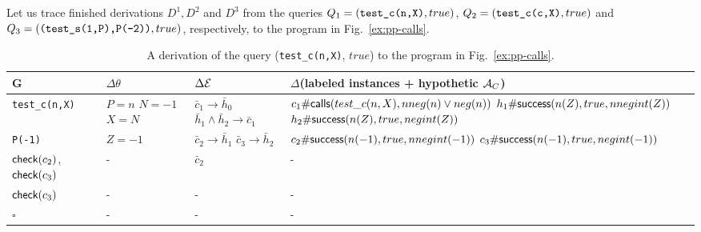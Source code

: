 \documentclass{llncs}
\newcommand{\AC}
  {\ensuremath{{\cal A}_{C}}}
\newcommand{\kbd}[1]{\mbox{\tt #1}}
\newcommand{\emptyGoal}{\ensuremath{\square}}
\newcommand{\ADeps}{\ensuremath{{\cal E}}}
\newcommand{\asrId}[1]{\ensuremath{c_{#1}}}
\newcommand{\negAsrId}[1]{\ensuremath{\bar{c}_{#1}}}
\newcommand{\hypId}[1]{\ensuremath{h_{#1}}}
\newcommand{\negHypId}[1]{\ensuremath{\bar{h}_{#1}}}
\newcommand{\checkLitLab}[1]{\ensuremath{\textsf{check}(#1)}}
\newcommand{\labCallsAsr}[3]
  {\ensuremath{\textsf{\asrId{#1}\#calls}(#2, #3)}}
\newcommand{\labSuccessAsr}[4]
  {\ensuremath{\textsf{\asrId{#1}\#success}(#2, #3, #4)}}
\newcommand{\hypSuccessAsr}[4]
  {\ensuremath{\textsf{\hypId{#1}\#success}(#2, #3, #4)}}
\begin{document}
Let us trace finished derivations $D^1,D^2$ and $D^3$ from the queries
$Q_1 = (\kbd{test\_c(n,X)}, true)$, $Q_2 = (\kbd{test\_c(c,X)}, true)$
and $Q_3 = (\kbd{(test\_s(1,P),P(-2))}, true)$, respectively, to the
program in Fig.~\ref{ex:pp-calls}.

\begin{table}[h]
  \caption{A derivation of the query (\kbd{test\_c(n,X)}, $true$) to
    the program in Fig.~\ref{ex:pp-calls}.}
  \begin{minipage}{\textwidth}
  \small
    \begin{tabular}{p{}|p{}p{}p{}}
      \hline
      G         
          & $\Delta\theta$  
          & $\Delta\ADeps$ 
          & $\Delta$(labeled instances + hypothetic $\AC$)
      \\ \hline
      {\tt test\_c(n,X)} 
          & $P = n$\newline
            $N = -1$\newline
            $X = N$    
          & $\negAsrId{1} \rightarrow \negHypId{0}$\newline
            $\negHypId{1} \wedge \negHypId{2}
             \rightarrow \negAsrId{1}$
          & $\labCallsAsr{1}{test\_c(n,X)}{nneg(n) \vee neg(n)}$\newline
            $\hypSuccessAsr{1}{n(Z)}{true}{nnegint(Z)}$\newline
            $\hypSuccessAsr{2}{n(Z)}{true}{negint(Z)}$ 
      \\ \hline
      {\tt P(-1)}
          & $Z = -1$         
          & $\negAsrId{2} \rightarrow \negHypId{1}$\newline
            $\negAsrId{3} \rightarrow \negHypId{2}$
          & $\labSuccessAsr{2}{n(-1)}{true}{nnegint(-1)}$\newline
            $\labSuccessAsr{3}{n(-1)}{true}{negint(-1)}$ 
      \\ \hline
      \checkLitLab{$\asrId{2}$},\newline
      \checkLitLab{$\asrId{3}$}         
          & -         
          & $\negAsrId{2}$
          & -
      \\ \hline
      \checkLitLab{$\asrId{3}$} 
          & -          
          & -
          & -
      \\ \hline
      \emptyGoal
          & -
          & -
          & -
      \\ \hline
    \end{tabular}
  \ \\
  \end{minipage}
  \label{tbl:test1}
\end{table}
\end{document}
